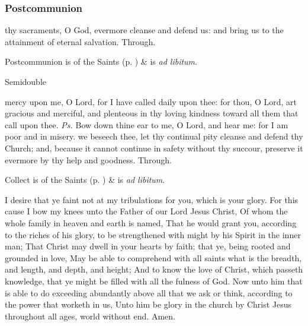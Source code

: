 \subsubsection{Postcommunion}
 thy sacraments, O God, evermore cleanse and defend us: and bring us to the attainment of eternal salvation. Through.

\vspace{0.25ex}

\begin{rubric}
     Postcommunion is of the Saints (p. \pageref{SPSaints}) \&  is \emph{ad libitum}.
\end{rubric}

\begin{inhead}
{Semidouble}
\end{inhead}

\properantiphonfix

\introit
{} mercy upon me, O Lord, for I have called daily upon thee: for thou, O Lord, art gracious and merciful, and plenteous in thy loving kindness toward all them that call upon thee. \textit{Ps.} Bow down thine ear to me, O Lord, and hear me: for I am poor and in misery.
\collect
{} we beseech thee, let thy continual pity cleanse and defend thy Church; and, because it cannot continue in safety without thy succour, preserve it evermore by thy help and goodness. Through.
\begin{rubric}
     Collect is of the Saints (p. \pageref{SPSaints}) \&  is \emph{ad libitum}.
\end{rubric}

 I desire that ye faint not at my tribulations for you, which is your glory. For this cause I bow my knees unto the Father of our Lord Jesus Christ, Of whom the whole family in heaven and earth is named, That he would grant you, according to the riches of his glory, to be strengthened with might by his Spirit in the inner man; That Christ may dwell in your hearts by faith; that ye, being rooted and grounded in love, May be able to comprehend with all saints what is the breadth, and length, and depth, and height; And to know the love of Christ, which passeth knowledge, that ye might be filled with all the fulness of God. Now unto him that is able to do exceeding abundantly above all that we ask or think, according to the power that worketh in us, Unto him be glory in the church by Christ Jesus throughout all ages, world without end. Amen.

